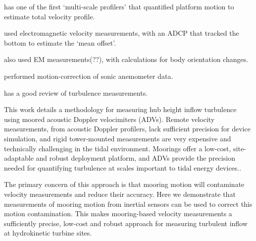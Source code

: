 \cite[]{Winkel++1996} has one of the first `multi-scale profilers' that quantified platform motion to estimate total velocity profile.

\cite[]{Stahr+Sanford1999} used electromagnetic velocity measurements, with an ADCP that tracked the bottom to estimate the `mean offset'. 

\cite[]{Hayes++1984} also used EM measurements(??), with calculations for body orientation changes.

\cite{Miller++2008} performed motion-correction of sonic anemometer data.

\cite{Lueck++2002} has a good review of turbulence measurements. 


This work details a methodology for measuring hub height inflow turbulence using moored acoustic Doppler velocimiters (ADVs). Remote velocity measurements, from acoustic Doppler profilers, lack sufficient precision for device simulation, and rigid tower-mounted measurements are very expensive and technically challenging in the tidal environment. Moorings offer a low-cost, site-adaptable and robust deployment platform, and ADVs provide the precision needed for quantifying turbulence at scales important to tidal energy devices..

The primary concern of this approach is that mooring motion will contaminate velocity measurements and reduce their accuracy. Here we demonstrate that  measurements of mooring motion from inertial sensors can be used to correct this motion contamination.  This makes mooring-based velocity measurements a sufficiently precise, low-cost and robust approach for measuring turbulent inflow at hydrokinetic turbine sites.

